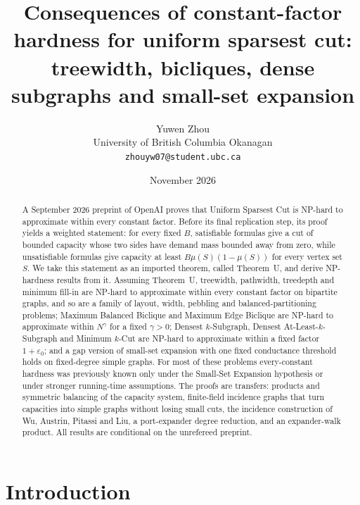 \documentclass[11pt,letterpaper]{article}
\title{Consequences of constant-factor hardness for uniform sparsest cut:\\
treewidth, bicliques, dense subgraphs and small-set expansion}
\author{Yuwen Zhou\\[2pt] \normalsize University of British Columbia Okanagan\\
\normalsize\texttt{zhouyw07@student.ubc.ca}}
\date{November 2026}
\theoremstyle{definition}
\theoremstyle{remark}
\newcommand{\eps}{\varepsilon}
\begin{document}
\maketitle

\begin{abstract}
A September 2026 preprint of OpenAI proves that Uniform Sparsest Cut is
NP-hard to approximate within every constant factor. Before its final
replication step, its proof yields a weighted statement: for every fixed
\(B\), satisfiable formulas give a cut of bounded capacity whose two sides
have demand mass bounded away from zero, while unsatisfiable formulas give
capacity at least \(B\mu(S)(1-\mu(S))\) for every vertex set \(S\). We take
this statement as an imported theorem, called Theorem~U, and derive
NP-hardness results from it. Assuming Theorem~U, treewidth, pathwidth,
treedepth and minimum fill-in are NP-hard to approximate within every
constant factor on bipartite graphs, and so are a family of layout, width,
pebbling and balanced-partitioning problems; Maximum Balanced Biclique and
Maximum Edge Biclique are NP-hard to approximate within \(N^{\gamma}\) for a
fixed \(\gamma>0\); Densest \(k\)-Subgraph, Densest At-Least-\(k\)-Subgraph
and Minimum \(k\)-Cut are NP-hard to approximate within a fixed factor
\(1+\eps_0\); and a gap version of small-set expansion with one fixed
conductance threshold holds on fixed-degree simple graphs. For most of these
problems every-constant hardness was previously known only under the
Small-Set Expansion hypothesis or under stronger running-time assumptions.
The proofs are transfers: products and symmetric balancing of the capacity
system, finite-field incidence graphs that turn capacities into simple
graphs without losing small cuts, the incidence construction of Wu,
Austrin, Pitassi and Liu, a port-expander degree reduction, and an
expander-walk product. All results are conditional on the unrefereed
preprint.
\end{abstract}

\section{Introduction}
\end{document}

